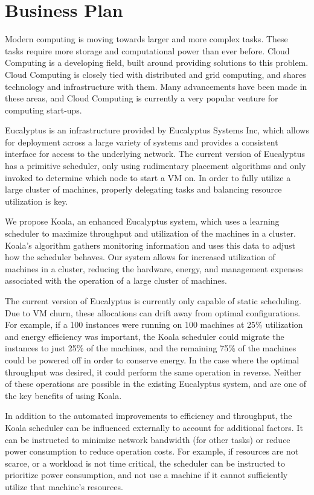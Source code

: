 \section{Business Plan}
\label{sec:bizplan}
  Modern computing is moving towards larger and more complex tasks.  These tasks require more storage and computational power than ever before.  Cloud Computing is a developing field, built around providing solutions to this problem.  Cloud Computing is closely tied with distributed and grid computing, and shares technology and infrastructure with them.  Many advancements have been made in these areas, and Cloud Computing is currently a very popular venture for computing start-ups.

  Eucalyptus is an infrastructure provided by Eucalyptus Systems Inc, which allows for deployment across a large variety of systems and provides a consistent interface for access to the underlying network.  The current version of Eucalyptus has a primitive scheduler, only using rudimentary placement algorithms and only invoked to determine which node to start a VM on.  In order to fully utilize a large cluster of machines, properly delegating tasks and balancing resource utilization is key.

  We propose Koala, an enhanced Eucalyptus system, which uses a learning scheduler to maximize throughput and utilization of the machines in a cluster.  Koala's algorithm gathers monitoring information and uses this data to adjust how the scheduler behaves.  Our system allows for increased utilization of machines in a cluster, reducing the hardware, energy, and management expenses associated with the operation of a large cluster of machines.

  The current version of Eucalyptus is currently only capable of static scheduling.  Due to VM churn, these allocations can drift away from optimal configurations.  For example, if a 100 instances were running on 100 machines at 25\% utilization and energy efficiency was important, the Koala scheduler could migrate the instances to just 25\% of the machines, and the remaining 75\% of the machines could be powered off in order to conserve energy.  In the case where the optimal throughput was desired, it could perform the same operation in reverse.  Neither of these operations are possible in the existing Eucalyptus system, and are one of the key benefits of using Koala.

  In addition to the automated improvements to efficiency and throughput, the Koala scheduler can be influenced externally to account for additional factors.  It can be instructed to minimize network bandwidth (for other tasks) or reduce power consumption to reduce operation costs.  For example, if resources are not scarce, or a workload is not time critical, the scheduler can be instructed to prioritize power consumption, and not use a machine if it cannot sufficiently utilize that machine's resources.

